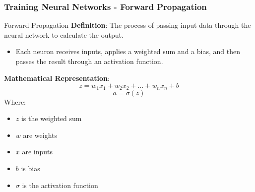 \documentclass[aspectratio=169]{beamer}
\begin{document}
\begin{frame}[fragile]
    \frametitle{Training Neural Networks - Forward Propagation}
    \begin{block}{Forward Propagation}
        \textbf{Definition}: The process of passing input data through the neural network to calculate the output.
        \begin{itemize}
            \item Each neuron receives inputs, applies a weighted sum and a bias, and then passes the result through an activation function.
        \end{itemize}
        
        \textbf{Mathematical Representation}:
        \begin{equation}
            z = w_1 x_1 + w_2 x_2 + ... + w_n x_n + b
        \end{equation}
        \begin{equation}
            a = \sigma(z)
        \end{equation}
        Where:
        \begin{itemize}
            \item \( z \) is the weighted sum
            \item \( w \) are weights
            \item \( x \) are inputs
            \item \( b \) is bias
            \item \( \sigma \) is the activation function
        \end{itemize}
    \end{block}
\end{frame}
\end{document}
